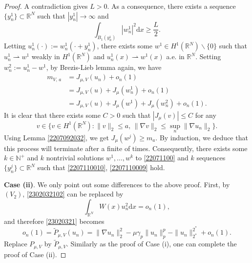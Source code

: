 \documentclass[10pt]{article}
\numberwithin{equation}{section}
\newcommand{\ud}{\mathrm{d}}
\numberwithin{equation}{section}
\begin{document}
\begin{proof}
A contradiction gives $L>0$. As a consequence, there exists a sequence $\{y_n^1\}\subset \mathbb{R}^N$ such that $|y_n^1|\to \infty$ and
\[
\int_{B_1(y^1_n)}|w^1_n|^2 \ud x \ge \frac{L}{2}.
\]
Letting $u^1_n(\cdot):=w^1_n(\cdot+y^1_n)$, there exists some $w^1\in H^1(\mathbb{R}^N)\backslash \{0\}$
such that $u^1_n\rightharpoonup w^1$ weakly in $H^1(\mathbb{R}^N)$ and $u^1_n(x)\rightharpoonup w^1(x)$ a.e. in $\mathbb{R}^N$. Setting $w^2_n:=u^1_n-w^1$, by Brezis-Lieb lemma again, we have
\[
\begin{aligned}
{m}_{V,\, a} &=J_{\mu, V}(u_n)+o_n(1)\\
&=J_{\mu, V}(u)+J_{\mu}(w_n^1)+o_n(1)\\
&=J_{\mu, V}(u)+J_{\mu}(w^1)+J_{\mu}(w^2_n)+o_n(1).
\end{aligned}
\]
It is clear that there exists some $C>0$ such that $|J_{\mu}(v)|\le C$ for any
$$v\in \{v\in H^1(\mathbb{R}^N): \|v\|_2\le a,\, \|\nabla v\|_2\le \underset{n}{\sup} \|\nabla u_n\|_2\}.$$
Using Lemma \ref{2207092032}, we get $J_{\mu}(w^j)\ge m_a$. By induction, we deduce that this process will terminate after a finite of times. Consequently, there exists some $k\in \mathbb{N}^+$ and $k$ nontrivial solutions $w^1,\dots, w^k$ to \eqref{22071100} and $k$ sequences $\{y_n^j\}\subset\mathbb{R}^N$ such that \eqref{2207110010}, \eqref{2207110009} hold.

\medskip\noindent
{\bf Case (ii)}. We only point out some differences to the above proof. First, by $(V_2)$, \eqref{2302032102} can be replaced by
\begin{equation*}
\int_{\mathbb{R}^N}W(x)u_n^2 \ud x=o_n(1),
\end{equation*}
and therefore \eqref{23020321} becomes
\[
o_n(1)=\widetilde{P}_{\mu, V}(u_n)=\|\nabla u_n\|_2^2-\mu\gamma_p\|u_n\|_p^p-\|u_n\|_{2^*}^{2^*}+o_n(1).
\]
Replace $P_{\mu, V}$ by $\widetilde{P}_{\mu, V}$. Similarly as the proof of Case (i), one can complete the proof of Case (ii).
\end{proof}
\end{document}
